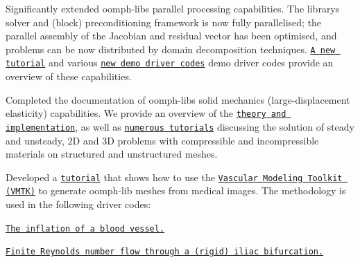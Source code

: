 \begin{DoxyItemize}
\item Significantly extended {\ttfamily oomph-\/lib\textquotesingle{}s} parallel processing capabilities. The library\textquotesingle{}s solver and (block) preconditioning framework is now fully parallelised; the parallel assembly of the Jacobian and residual vector has been optimised, and problems can be now distributed by domain decomposition techniques. \href{../../mpi/general_mpi/html/index.html}{\tt A new tutorial} and various \href{../../example_code_list/html/index.html#parallel}{\tt new demo driver codes} demo driver codes provide an overview of these capabilities. ~\newline
~\newline

\item Completed the documentation of {\ttfamily oomph-\/lib\textquotesingle{}s} solid mechanics (large-\/displacement elasticity) capabilities. We provide an overview of the \href{../../solid/solid_theory/html/index.html}{\tt theory and implementation}, as well as \href{../../example_code_list/html/index.html#solid}{\tt numerous tutorials} discussing the solution of steady and unsteady, 2D and 3D problems with compressible and incompressible materials on structured and unstructured meshes. ~\newline
~\newline

\item Developed a \href{../../meshes/mesh_from_vmtk/html/index.html}{\tt tutorial} that shows how to use the \href{http://www.vmtk.org}{\tt Vascular Modeling Toolkit (V\+M\+TK)} to generate {\ttfamily oomph-\/lib} meshes from medical images. The methodology is used in the following driver codes\+: ~\newline
~\newline

\begin{DoxyItemize}
\item \href{../../solid/vmtk_solid/html/index.html}{\tt The inflation of a blood vessel.} ~\newline
~\newline

\item \href{../../navier_stokes/vmtk_fluid/html/index.html}{\tt Finite Reynolds number flow through a (rigid) iliac bifurcation.} ~\newline
~\newline


\end{DoxyItemize}
\end{DoxyItemize}
